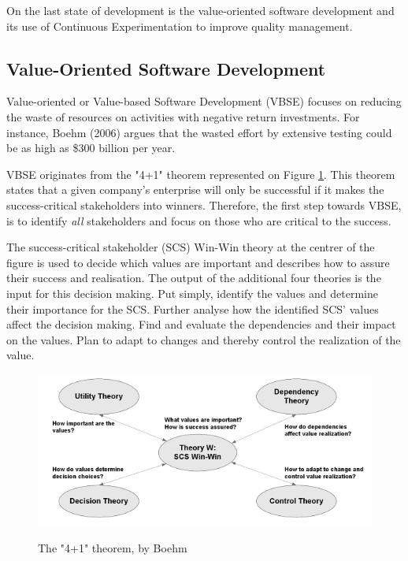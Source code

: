 \documentclass{sig-alternate}
\begin{document}
On the last state of development is the value-oriented software development and its use of Continuous Experimentation to improve quality management. 

\subsection{Value-Oriented Software Development}
Value-oriented or Value-based Software Development (VBSE) focuses on reducing the waste of resources on activities with negative return investments. For instance, Boehm (2006) argues that the wasted effort by extensive testing could be as high as \$300 billion per year\cite{stefan:valuebased}.

VBSE originates from the "4+1" theorem represented on Figure \ref{fig:fouronetheorem}. This theorem states that a given company's enterprise will only be successful if it makes the success-critical stakeholders into winners. Therefore, the first step towards VBSE, is to identify \textit{all} stakeholders and  focus on those who are critical to the success.

The success-critical stakeholder (SCS) Win-Win theory at the centrer of the figure is used to decide which values are important and describes how to assure their success and realisation. The output of the additional four theories is the input for this decision making. Put simply, identify the values and determine their importance for the SCS. Further analyse how the identified SCS' values affect the decision making. Find and evaluate the dependencies and their impact on the values. Plan to adapt to changes and thereby control the realization of the value.\cite{stefan:valuebased}

\begin{figure}
\caption{The "4+1" theorem, by Boehm}
\centering
\includegraphics[scale=0.6]{Umlet/4+1theorem}
\label{fig:fouronetheorem}
\end{figure} 
\end{document}
